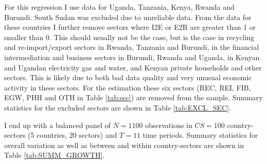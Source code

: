\documentclass[a4paper]{article}
\begin{document}
For this regression I use data for Uganda, Tanzania, Kenya, Rwanda and Burundi. South Sudan was excluded due to unreliable data. From the data for these countries I further remove sectors where I2E or E2R are greater than 1 or smaller than 0. This should usually not be the case, but is the case in recycling and re-import/export sectors in Rwanda, Tanzania and Burundi, in the financial intermediation and business sectors in Burundi, Rwanda and Uganda, in Kenyan and Ugandan electricity gas and water, and Kenyan private households and other sectors. This is likely due to both bad data quality and very unusual economic activity in these sectors. For the estimation these six sectors (REC, REI, FIB, EGW, PHH and OTH in Table \ref{tab:sec}) are removed from the sample. %
Summary statistics for the excluded sectors are shown in Table \ref{tab:EXCL_SEC}. \newline


I end up with a balanced panel of $N = 1100$ observations in $CS = 100$ country-sectors (5 countries, 20 sectors) and $T = 11$ time periods. Summary statistics for overall variation as well as between and within country-sectors are shown in Table \ref{tab:SUMM_GROWTH}. %
\end{document}
